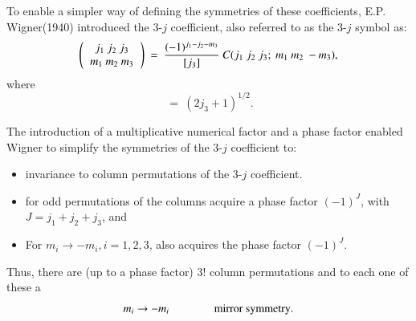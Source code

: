 To enable a simpler way of defining the symmetries of these coefficients, E.P. Wigner(1940) introduced the 3-$j$ coefficient, also referred to as the 3-$j$ symbol as:
\begin{equation}
\left(
\begin{tabular}{ccc}
$j_1\ j_2\ j_3$ \\ $m_1\ m_2\ m_3$ \\ 
\end{tabular} 
\right) 
\ = \ \frac{(-1)^{j_1-j_2-m_3}}{[j_3]}\ C(j_1\ j_2\ j_3;\ m_1\ m_2\ -m_3), \label{chap29-eq7}
\end{equation}
where
\begin{equation}
[j_3]\ =\ (2j_3 + 1)^{1/2}.\label{chap29-eq8}
\end{equation}

The introduction of a multiplicative numerical factor and a phase factor enabled Wigner to simplify the symmetries of the 3-$j$ coefficient to:
\begin{itemize}
\item invariance to column permutations of the 3-$j$ coefficient.
\item for odd permutations of the columns acquire a phase factor $(-1)^J$, with $J=j_1+j_2+j_3$, and 
\item For $m_i \rightarrow -m_i, i=1,2,3$,  also acquires the phase factor $(-1)^J$.
\end{itemize}

Thus, there are (up to a phase factor) 3! column permutations and to each one of these a 
\begin{equation}
m_i \rightarrow -m_i \qquad \qquad {\rm mirror\ symmetry}.\label{chap29-eq9}
\end{equation}

